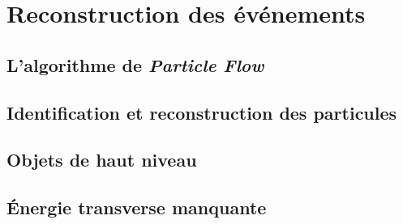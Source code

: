 \section{Reconstruction des événements}

\subsection{L'algorithme de \emph{Particle Flow}}

\subsection{Identification et reconstruction des particules}

\subsection{Objets de haut niveau}

\subsection{Énergie transverse manquante}
